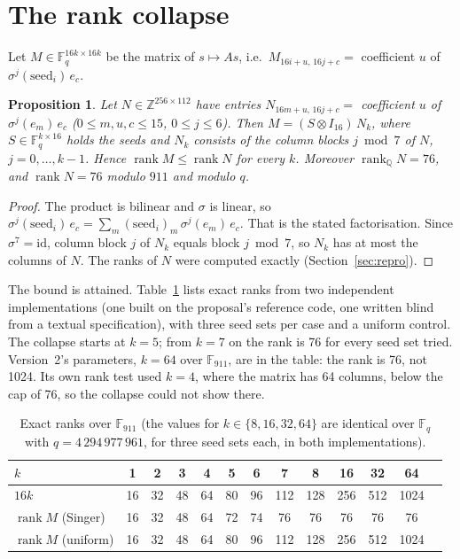 \documentclass[11pt]{article}
\newtheorem{proposition}{Proposition}
\theoremstyle{remark}
\newcommand{\F}{\mathbb{F}}
\DeclareMathOperator{\rank}{rank}
\begin{document}
\section{The rank collapse}\label{sec:rank}

Let $M\in\F_q^{16k\times16k}$ be the matrix of $s\mapsto As$, i.e.\ $M_{16i+u,\,16j+c}=$ coefficient $u$ of
$\sigma^{j}(\mathrm{seed}_i)\,e_c$.

\begin{proposition}\label{prop:rank}
Let $N\in\mathbb{Z}^{256\times112}$ have entries $N_{16m+u,\,16j+c}=$ coefficient $u$ of $\sigma^{j}(e_m)\,e_c$
($0\le m,u,c\le15$, $0\le j\le6$). Then $M=(S\otimes I_{16})\,N_k$, where $S\in\F_q^{k\times16}$ holds the seeds and
$N_k$ consists of the column blocks $j\bmod 7$ of $N$, $j=0,\dots,k-1$. Hence $\rank M\le\rank N$ for every $k$.
Moreover $\rank_{\mathbb{Q}}N=76$, and $\rank N=76$ modulo $911$ and modulo $q$.
\end{proposition}

\begin{proof}
The product is bilinear and $\sigma$ is linear, so $\sigma^{j}(\mathrm{seed}_i)\,e_c=\sum_m(\mathrm{seed}_i)_m\,
\sigma^{j}(e_m)\,e_c$. That is the stated factorisation. Since $\sigma^7=\mathrm{id}$, column block $j$ of $N_k$ equals
block $j\bmod7$, so $N_k$ has at most the columns of $N$. The ranks of $N$ were computed exactly (Section~\ref{sec:repro}).
\end{proof}

The bound is attained. Table~\ref{tab:rank} lists exact ranks from two independent implementations (one built on the
proposal's reference code, one written blind from a textual specification), with three seed sets per case and a
uniform control. The collapse starts at $k=5$; from $k=7$ on the rank is 76 for every seed set tried. Version~2's
parameters, $k=64$ over $\F_{911}$, are in the table: the rank is 76, not 1024. Its own rank test used $k=4$, where the
matrix has 64 columns, below the cap of 76, so the collapse could not show there.

\begin{table}[h]\centering\small
\begin{tabular}{lcccccccccccc}\toprule
$k$ & 1&2&3&4&5&6&7&8&16&32&64\\\midrule
$16k$ & 16&32&48&64&80&96&112&128&256&512&1024\\
$\rank M$ (Singer) & 16&32&48&64&72&74&76&76&76&76&76\\
$\rank M$ (uniform) & 16&32&48&64&80&96&112&128&256&512&1024\\\bottomrule
\end{tabular}
\caption{Exact ranks over $\F_{911}$ (the values for $k\in\{8,16,32,64\}$ are identical over $\F_q$ with
$q=4\,294\,977\,961$, for three seed sets each, in both implementations).}\label{tab:rank}
\end{table}
\end{document}
